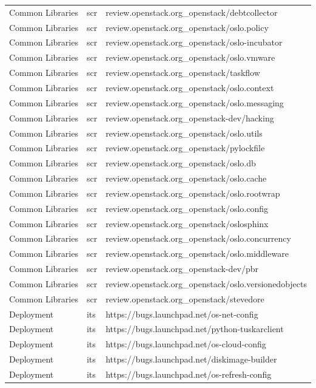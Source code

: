 \begin{center}
\begin{longtable}{|p{4cm}|p{1cm}|p{10cm}|}
Common Libraries&scr&review.openstack.org\_openstack/debtcollector\\ 
Common Libraries&scr&review.openstack.org\_openstack/oslo.policy\\ 
Common Libraries&scr&review.openstack.org\_openstack/oslo-incubator\\ 
Common Libraries&scr&review.openstack.org\_openstack/oslo.vmware\\ 
Common Libraries&scr&review.openstack.org\_openstack/taskflow\\ 
Common Libraries&scr&review.openstack.org\_openstack/oslo.context\\ 
Common Libraries&scr&review.openstack.org\_openstack/oslo.messaging\\ 
Common Libraries&scr&review.openstack.org\_openstack-dev/hacking\\ 
Common Libraries&scr&review.openstack.org\_openstack/oslo.utils\\ 
Common Libraries&scr&review.openstack.org\_openstack/pylockfile\\ 
Common Libraries&scr&review.openstack.org\_openstack/oslo.db\\ 
Common Libraries&scr&review.openstack.org\_openstack/oslo.cache\\ 
Common Libraries&scr&review.openstack.org\_openstack/oslo.rootwrap\\ 
Common Libraries&scr&review.openstack.org\_openstack/oslo.config\\ 
Common Libraries&scr&review.openstack.org\_openstack/oslosphinx\\ 
Common Libraries&scr&review.openstack.org\_openstack/oslo.concurrency\\ 
Common Libraries&scr&review.openstack.org\_openstack/oslo.middleware\\ 
Common Libraries&scr&review.openstack.org\_openstack-dev/pbr\\ 
Common Libraries&scr&review.openstack.org\_openstack/oslo.versionedobjects\\ 
Common Libraries&scr&review.openstack.org\_openstack/stevedore\\ 
Deployment&its&https://bugs.launchpad.net/os-net-config\\ 
Deployment&its&https://bugs.launchpad.net/python-tuskarclient\\ 
Deployment&its&https://bugs.launchpad.net/os-cloud-config\\ 
Deployment&its&https://bugs.launchpad.net/diskimage-builder\\ 
Deployment&its&https://bugs.launchpad.net/os-refresh-config\\ 

\end{longtable}
\end{center}

